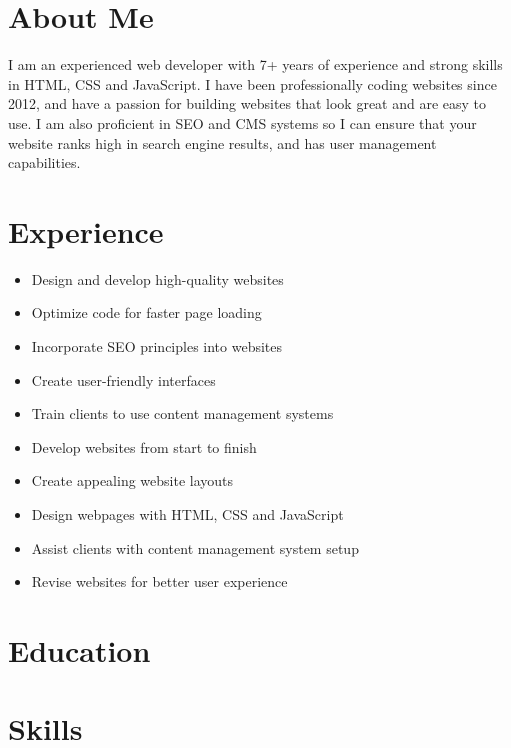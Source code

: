\documentclass{moderncv}
\begin{document}
\makecvtitle

\section{About Me}
I am an experienced web developer with 7+ years of experience and strong skills in HTML, CSS and JavaScript. I have been professionally coding websites since 2012, and have a passion for building websites that look great and are easy to use. I am also proficient in SEO and CMS systems so I can ensure that your website ranks high in search engine results, and has user management capabilities.

\section{Experience}
\begin{itemize}
  \item Design and develop high-quality websites
  \item Optimize code for faster page loading
  \item Incorporate SEO principles into websites
  \item Create user-friendly interfaces
  \item Train clients to use content management systems
\end{itemize}

\begin{itemize}
  \item Develop websites from start to finish
  \item Create appealing website layouts
  \item Design webpages with HTML, CSS and JavaScript
  \item Assist clients with content management system setup
  \item Revise websites for better user experience
\end{itemize}

\section{Education}

\section{Skills}
\end{document}

